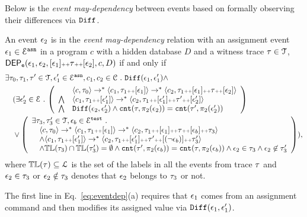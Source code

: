 {Below is the \emph{event may-dependency} between events based on formally observing their differences via $\mathtt{Diff}$.}
\begin{defn}
\label{def:event_dep}
An event $\mathtt{\epsilon}_2$ is in the \emph{event may-dependency} relation with an assignment event $\mathtt{\epsilon}_1 \in \mathcal{E}^{\mathtt{{asn}}}$ in a program ${c}$  with a hidden database $D$ and a witness trace $\mathtt{\tau} \in \mathcal{T}$,
$\mathsf{DEP_{\mathtt{e}}}(\mathtt{\epsilon}_1, \mathtt{\epsilon}_2, [\mathtt{\epsilon}_1 ] {\scriptscriptstyle ++} \mathtt{\tau} {\scriptscriptstyle ++} [\mathtt{\epsilon}_2], c, D)$ if and only if
\begin{subequations}
\begin{align}
&  
\exists \trace_0, \trace_1, \trace' \in \mathcal{T},\event_1' \in \eventset^{\asn}, {c}_1, {c}_2  \in \cdom  \st \diff(\event_1, \event_1') \land \\
& 
\quad (\exists  \event_2' \in \eventset \st 
\left(
\begin{array}{ll}   
  & \config{{c}, \trace_0} \rightarrow^{*} 
  \config{{c}_1, \trace_1 \tracecat [\event_1]}  \rightarrow^{*} 
  \config{{c}_2,  \trace_1 \tracecat [\event_1] \tracecat \trace \tracecat [\event_2] } 
   \\ 
   \bigwedge &
   \config{{c}_1, \trace_1 \tracecat [\event_1']}  \rightarrow^{*}
    \config{{c}_2,  \trace_1 \tracecat[ \event_1'] \tracecat \trace' \tracecat [\event_2'] } 
  \\
  \bigwedge & 
  \diff(\event_2,\event_2' ) \land 
  \vcounter(\trace, \pi_2(\event_2))
  = 
  \vcounter(\trace', \pi_2(\event_2'))\\
  \end{array}
  \right)\\ 
  & 
  \quad
  \lor 
  \left(
  \begin{array}{l} 
  \exists \trace_3, \trace_3'  \in \mathcal{T}, \event_b \in \eventset^{\test} \st 
  \\
   \quad \config{{c}, \trace_0} \rightarrow^{*} \config{{c}_1, \trace_1 \tracecat [\event_1]}  \rightarrow^{*}
   \config{c_2,  \trace_1 \tracecat [\event_1] \tracecat
   \trace \tracecat [\event_b] \tracecat  \trace_3} 
\\ \quad \land
\config{{c}_1, \trace_1 \tracecat [\event_1']}  \rightarrow^{*} 
\config{c_2,  \trace_1 \tracecat [\event_1'] \tracecat \trace' \tracecat [(\neg \event_b)] \tracecat \trace_3'} 
\\
\quad \land \tlabel({\trace_3}) \cap \tlabel({\trace_3'})
= \emptyset
\land \vcounter(\trace', \pi_2(\event_b)) = \vcounter(\trace, \pi_2(\event_b)) 
    \land \event_2 \in \trace_3
    \land \event_2 \not\in \trace_3'
  \end{array}
  \right)
  ),
\end{align}
\label{eq:eventdep}
\end{subequations}
where $\mathbb{TL}(\mathtt{\tau}) \subseteq \mathcal{L}$ is the set of the labels in all the events from trace $\mathtt{\tau}$ and $\mathtt{\epsilon}_2 \in \mathtt{\tau}_3$ or $\mathtt{\epsilon}_2 \notin \mathtt{\tau}_3$ denotes that $\mathtt{\epsilon}_2$ belongs to $\mathtt{\tau}_3$ or not.
\end{defn}
The first line in Eq.~\ref{eq:eventdep}(a) requires that $\mathtt{\epsilon}_1$ comes from an assignment command and then modifies its assigned value via $\mathtt{Diff}(\mathtt{\epsilon}_1, \mathtt{\epsilon}_1')$.

